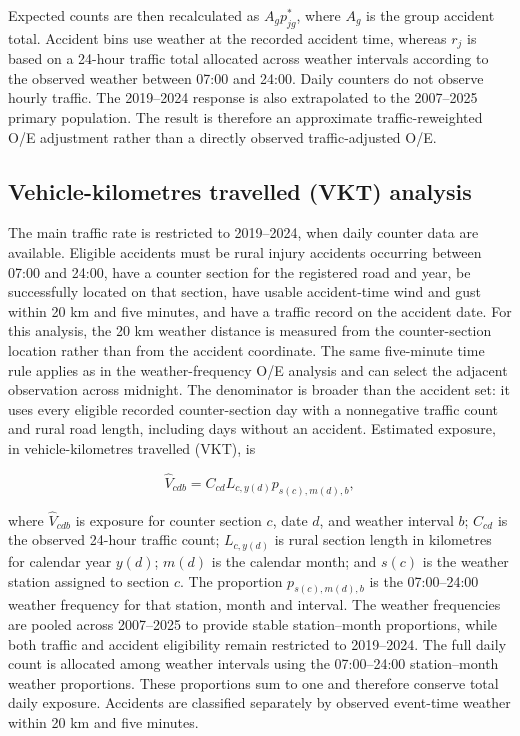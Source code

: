 Expected counts are then recalculated as \(A_g p^{*}_{jg}\), where \(A_g\) is the group accident total. Accident bins use
weather at the recorded accident time, whereas \(r_j\) is based on a 24-hour
traffic total allocated across weather intervals according to the observed
weather between 07:00 and 24:00. Daily
counters do not observe hourly traffic. The 2019--2024 response is also
extrapolated to the 2007--2025 primary population. The result is therefore an approximate traffic-reweighted O/E adjustment rather than a directly observed traffic-adjusted O/E.

\subsection{Vehicle-kilometres travelled (VKT) analysis}
\label{sec:vkt-analysis}

The main traffic rate is restricted to 2019--2024, when daily counter data are
available. Eligible accidents must be rural injury accidents occurring between
07:00 and 24:00, have a counter section for the registered road and year, be
successfully located on that section, have usable accident-time wind and gust
within 20 km and five minutes, and have a traffic record on the accident date.
For this analysis, the 20 km weather distance is measured from the
counter-section location rather than from the accident coordinate. The same
five-minute time rule applies as in the weather-frequency O/E analysis and can select the adjacent observation
across midnight. The denominator is broader than the accident set: it uses
every eligible recorded counter-section day with a nonnegative traffic count
and rural road length, including days without an accident. Estimated exposure, in vehicle-kilometres travelled (VKT), is

\begin{equation}
\label{eq:monthly-vkt}
\widehat V_{cdb}=C_{cd}L_{c,y(d)}p_{s(c),m(d),b},
\end{equation}

where \(\widehat V_{cdb}\) is exposure for counter section \(c\), date \(d\),
and weather interval \(b\); \(C_{cd}\) is the observed 24-hour traffic count;
\(L_{c,y(d)}\) is rural section length in kilometres for calendar year \(y(d)\);
\(m(d)\) is the calendar month; and \(s(c)\) is the weather station assigned to
section \(c\). The proportion \(p_{s(c),m(d),b}\) is the 07:00--24:00 weather
frequency for that station, month and interval. The weather frequencies are pooled across 2007--2025 to provide stable
station--month proportions, while both traffic and accident eligibility remain
restricted to 2019--2024. The full daily count is allocated among weather intervals using the
07:00--24:00 station--month weather proportions. These proportions sum to one
and therefore conserve total daily exposure. Accidents are
classified separately by observed event-time weather within 20 km and five
minutes.

